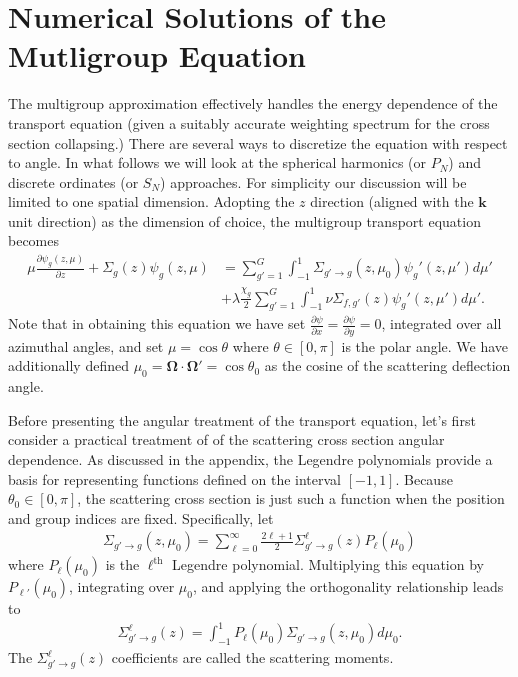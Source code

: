 \documentclass[11pt]{article}
\renewcommand\vec{\mathbf}
\begin{document}
\section{Numerical Solutions of the Mutligroup Equation}
\label{sec:orgheadline17}
The multigroup approximation effectively handles the energy dependence of the transport equation (given a suitably accurate weighting spectrum for the cross section collapsing.)  There are several ways to discretize the equation with respect to angle.  In what follows we will look at the spherical harmonics (or \(P_N\)) and discrete ordinates (or \(S_N\)) approaches.  For simplicity our discussion will be limited to one spatial dimension.  Adopting the \(z\) direction (aligned with the \(\vec{k}\) unit direction) as the dimension of choice, the multigroup transport equation becomes
\begin{align}
  \mu \frac{\partial \psi_g(z,\mu)}{\partial z}
  + \Sigma_g(z) \psi_g(z,\mu)
  &= \sum_{g'=1}^G \int_{-1}^1 \Sigma_{g'\rightarrow g}(z, \mu_0) \psi_g'(z,\mu') d\mu' \\
  &+ \lambda\frac{\chi_g}{2} \sum_{g'=1}^G \int_{-1}^1 \nu\Sigma_{f,g'}(z) \psi_g'(z,\mu') d\mu'.
  \label{eq::1dMgTransportEqn}
\end{align}
Note that in obtaining this equation we have set \(\frac{\partial \psi}{\partial x} = \frac{\partial \psi}{\partial y} = 0\), integrated over all azimuthal angles, and set \(\mu=\cos\theta\) where \(\theta \in [0,\pi]\) is the polar angle.  We have additionally defined \(\mu_0 = \vec{\Omega}\cdot\vec{\Omega}' = \cos\theta_0\) as the cosine of the scattering deflection angle.

Before presenting the angular treatment of the transport equation, let's first consider a practical treatment of of the scattering cross section angular dependence.  As discussed in the appendix, the Legendre polynomials provide a basis for representing functions defined on the interval \([-1,1]\).  Because \(\theta_0 \in [0,\pi]\), the scattering cross section is just such a function when the position and group indices are fixed.  Specifically, let
\begin{align}
  \Sigma_{g'\rightarrow g}(z, \mu_0) = \sum_{\ell=0}^\infty \frac{2\ell+1}{2} \Sigma_{g' \rightarrow g}^\ell(z) P_\ell(\mu_0)
\end{align}
where \(P_\ell(\mu_0)\) is the \(\ell^\text{th}\) Legendre polynomial.  Multiplying this equation by \(P_{\ell'}(\mu_0)\), integrating over \(\mu_0\), and applying the orthogonality relationship leads to
\begin{align}
  \Sigma_{g' \rightarrow g}^\ell(z) = \int_{-1}^1 P_{\ell}(\mu_0)\Sigma_{g'\rightarrow g}(z, \mu_0) d\mu_0.
\end{align}
The \(\Sigma_{g' \rightarrow g}^\ell(z)\) coefficients are called the scattering moments.
\end{document}
